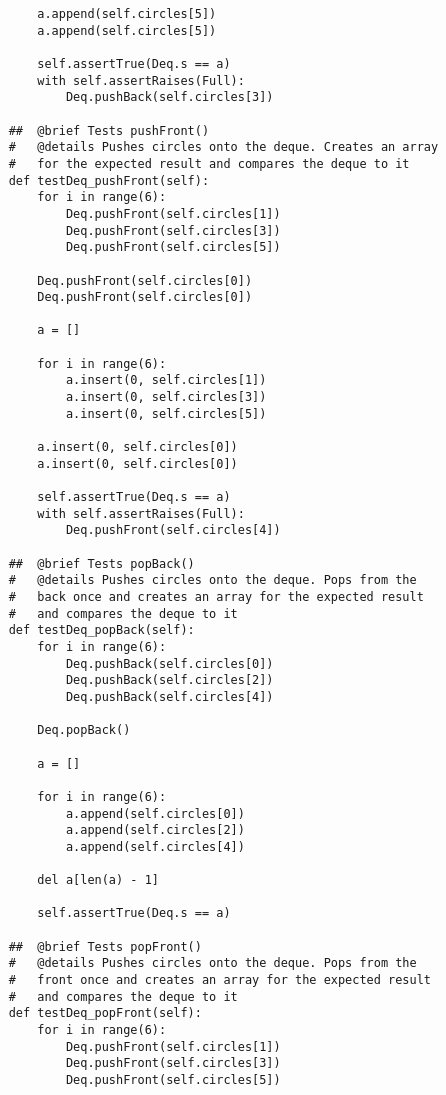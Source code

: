 \documentclass{article}
\begin{document}
\begin{lstlisting}
        a.append(self.circles[5])
        a.append(self.circles[5])

        self.assertTrue(Deq.s == a)
        with self.assertRaises(Full):
            Deq.pushBack(self.circles[3])
        
    ##  @brief Tests pushFront()
    #   @details Pushes circles onto the deque. Creates an array 
    #   for the expected result and compares the deque to it
    def testDeq_pushFront(self):
        for i in range(6):
            Deq.pushFront(self.circles[1])
            Deq.pushFront(self.circles[3])
            Deq.pushFront(self.circles[5])
            
        Deq.pushFront(self.circles[0])
        Deq.pushFront(self.circles[0])

        a = []

        for i in range(6):
            a.insert(0, self.circles[1])
            a.insert(0, self.circles[3])
            a.insert(0, self.circles[5])

        a.insert(0, self.circles[0])
        a.insert(0, self.circles[0])

        self.assertTrue(Deq.s == a)
        with self.assertRaises(Full):
            Deq.pushFront(self.circles[4])
    
    ##  @brief Tests popBack()
    #   @details Pushes circles onto the deque. Pops from the 
    #   back once and creates an array for the expected result 
    #   and compares the deque to it
    def testDeq_popBack(self):
        for i in range(6):
            Deq.pushBack(self.circles[0])
            Deq.pushBack(self.circles[2])
            Deq.pushBack(self.circles[4])

        Deq.popBack()

        a = []

        for i in range(6):
            a.append(self.circles[0])
            a.append(self.circles[2])
            a.append(self.circles[4])

        del a[len(a) - 1]

        self.assertTrue(Deq.s == a)
       
    ##  @brief Tests popFront()
    #   @details Pushes circles onto the deque. Pops from the 
    #   front once and creates an array for the expected result 
    #   and compares the deque to it
    def testDeq_popFront(self):
        for i in range(6):
            Deq.pushFront(self.circles[1])
            Deq.pushFront(self.circles[3])
            Deq.pushFront(self.circles[5])


\end{lstlisting}
\end{document}

